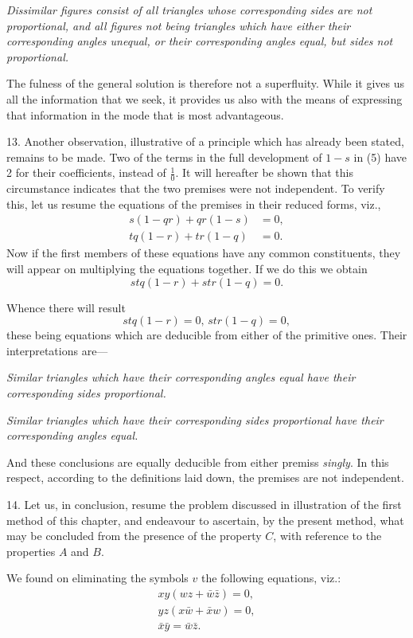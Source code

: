 \documentclass[oneside]{book}
\begin{document}
\textit{Dissimilar figures consist of all triangles whose corresponding
sides are not proportional, and all figures not being triangles which
have either their corresponding angles unequal, or their corresponding
angles equal, but sides not proportional.}

The fulness of the general solution is therefore not a superfluity.
While it gives us all the information that we seek, it
provides us also with the means of expressing that information
in the mode that is most advantageous.

13. Another observation, illustrative of a principle which has
already been stated, remains to be made. Two of the terms in
the full development of $1 - s$ in (5) have 2 for their coefficients,
instead of $\frac{1}{0}$. It will hereafter be shown that this circumstance
indicates that the two premises were not independent. To verify
this, let us resume the equations of the premises in their reduced
forms, viz.,
\begin{eqnarray*}
s(1-qr)+qr(1-s) &= 0,\\
tq(1-r)+tr(1-q) &= 0.
\end{eqnarray*}
Now if the first members of these equations have any common
constituents, they will appear on multiplying the equations together.
If we do this we obtain
\[
stq(1 - r) + str(1 - q) = 0.
\]

Whence there will result
\[
stq (1 - r) = 0\textrm{, }str (1 - q) = 0,
\]
these being equations which are deducible from either of the
primitive ones. Their interpretations are---

\textit{Similar triangles which have their corresponding angles equal
have their corresponding sides proportional.}

\textit{Similar triangles which have their corresponding sides proportional
have their corresponding angles equal. }

And these conclusions are equally deducible from either premiss \textit{singly}. In this respect, according to the definitions laid
down, the premises are not independent.

14. Let us, in conclusion, resume the problem discussed in
illustration of the first method of this chapter, and endeavour to
ascertain, by the present method, what may be concluded from
the presence of the property $C$, with reference to the properties
$A$ and $B$.

We found on eliminating the symbols $v$ the following equations,
viz.:
\setcounter{equation}{0}
\begin{eqnarray}
xy(wz + \bar{w}\bar{z}) = 0, \\
yz (x\bar{w} + \bar{x}w) = 0,\\
\bar{x}\bar{y} = \bar{w}\bar{z}.
\end{eqnarray}
\end{document}
